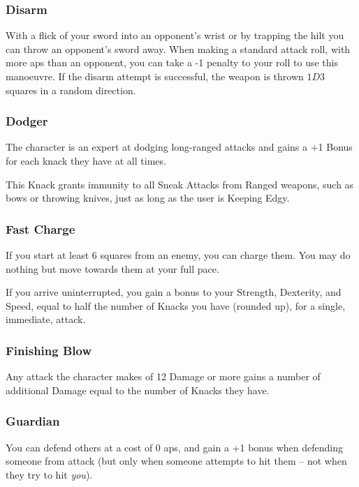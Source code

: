 \begin{multicols}{2}
\subsubsection{Disarm}

With a flick of your sword into an opponent's wrist or by trapping the hilt you can throw an opponent's sword away.
When making a standard attack roll, with more \glspl{ap} than an opponent, you can take a -1 penalty to your roll to use this manoeuvre.
If the disarm attempt is successful, the weapon is thrown $1D3$ squares in a random direction.

\subsubsection{Dodger}
\label{dodger}

The character is an expert at dodging long-ranged attacks and gains a +1 Bonus for each knack they have at all times.

This Knack grants immunity to all Sneak Attacks from Ranged weapons, such as bows or throwing knives, just as long as the user is Keeping Edgy.

\subsubsection{Fast Charge}

If you start at least 6 squares from an enemy, you can charge them.
You may do nothing but move towards them at your full pace.

If you arrive uninterrupted, you gain a bonus to your Strength, Dexterity, and Speed, equal to half the number of Knacks you have (rounded up), for a single, immediate, attack.

\subsubsection{Finishing Blow}\label{finishingblow}

Any attack the character makes of 12 Damage or more gains a number of additional Damage equal to the number of Knacks they have.

\subsubsection{Guardian}

You can defend others at a cost of 0 \glspl{ap}, and gain a +1 bonus when defending someone from attack (but only when someone attempts to hit them -- not when they try to hit \emph{you}).


\end{multicols}
